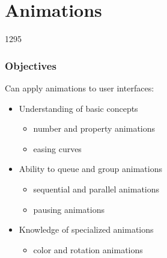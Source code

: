 %
%
%
%

\section{Animations}

\begin{slide}{1295}\frametitle{Objectives}

Can apply animations to user interfaces:

\begin{itemize}
\item Understanding of basic concepts
  \begin{itemize}
  \item number and property animations
  \item easing curves
  \end{itemize}
\item Ability to queue and group animations
  \begin{itemize}
  \item sequential and parallel animations
  \item pausing animations
  \end{itemize}
\item Knowledge of specialized animations
  \begin{itemize}
  \item color and rotation animations
  \end{itemize}
\end{itemize}

\end{slide}







